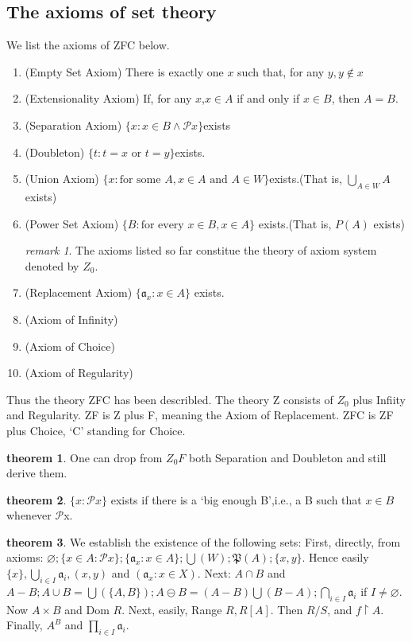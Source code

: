 \documentclass[a4paper,11pt]{article}%
\theoremstyle{remark}
\newtheorem*{remark}{remark}
\theoremstyle{definition}
\newtheorem{theorem}{theorem}[section]
\theoremstyle{definition}
\theoremstyle{plain}
\theoremstyle{definition}
\begin{document}
\subsection{The axioms of set theory} 
We list the axioms of ZFC below.
\begin{enumerate}
    \item (Empty Set Axiom) There is exactly one $x$ such that, for any $y,y\notin x$ 
    \item (Extensionality Axiom) If, for any $x$,$x\in A$ if and only if $x\in B$, then $A=B$.
    \item (Separation Axiom) $\{x:x\in B\land\mathcal{P}x\}$exists
    \item (Doubleton) $\{t:t=x \text{ or }t=y\}$exists.
    \item (Union Axiom) $\{x: \text{for some }A,x\in A \text{ and }A\in W\}$exists.(That is, $\bigcup_{A\in W}A$exists)
    \item (Power Set Axiom) $\{B:\text{for every }x\in B, x\in A\}$ exists.(That is, $P(A)$ exists)
    \begin{remark}
        The axioms listed so far constitue the theory of axiom system denoted by $Z_0$.
    \end{remark}
    \item (Replacement Axiom) $\{\mathfrak{a}_x:x\in A\}$ exists.
    \item (Axiom of Infinity)
    \item (Axiom of Choice)
    \item (Axiom of Regularity)
\end{enumerate}
Thus the theory ZFC has been describled. The theory Z consists of $Z_0$ 
plus Infiity and Regularity. ZF is Z plus F, meaning the Axiom of Replacement.
ZFC is ZF plus Choice, `C' standing for Choice.

\begin{theorem}
    One can drop from $Z_0F$ both Separation and Doubleton and still derive 
    them.
\end{theorem}
\begin{theorem}
    $\{x:\mathcal{P}x\}$ exists if there is a  `big enough B',i.e., a B such 
    that $x\in B$ whenever $\mathcal{P}$x.
\end{theorem}
\begin{theorem}
    We establish the existence of the following sets: First, directly, from 
    axioms: $\varnothing;\{x\in A:\mathcal{P}x\};\{\mathfrak{a}_x:x\in A\};\bigcup(W);\mathfrak{P}(A);\{x,y\}.$
    Hence easily $\{x\},\bigcup_{i\in I}\mathfrak{a}_i,(x,y)$ and $(\mathfrak{a}_x:x\in X)$.
    Next: $A\cap B$ and $A-B;A\cup B=\bigcup(\{A,B\});A\circleddash B=(A-B)\bigcup(B-A);\bigcap_{i\in I}\mathfrak{a}_i$
    if $I\neq\varnothing$. Now $A\times B$ and Dom $R$. Next, easily, Range $R,R[A].$ Then $R/S$, and
    $f\upharpoonright A.$ Finally, $A^B$ and $\prod_{i\in I}\mathfrak{a}_i$.
\end{theorem}
\end{document}

